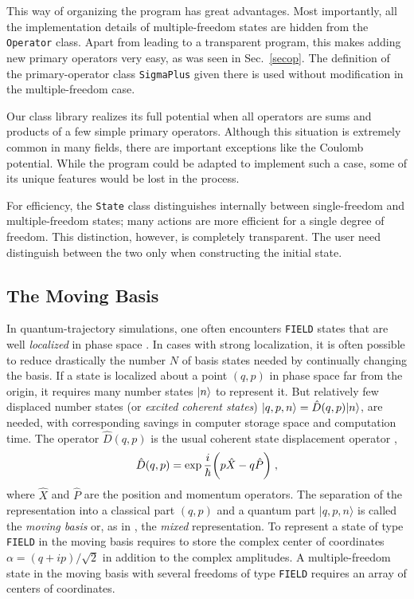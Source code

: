 This way of organizing the program has great advantages. 
Most importantly, all the
implementation details of multiple-freedom states are hidden from the {\tt
Operator} class. Apart from leading to a transparent program, this makes adding
new primary operators very easy, as was seen in Sec.~\ref{secop}. The
definition of the primary-operator class {\tt SigmaPlus} given there is used
without modification in the multiple-freedom case. 

Our class library realizes its full potential when all operators are sums and
products of a few simple primary operators. Although this situation is
extremely common in many fields, there are important exceptions like the
Coulomb potential. While the program could be adapted to implement such a case,
some of its unique features would be lost in the process.

For efficiency, the {\tt State} class distinguishes internally between
single-freedom and multiple-freedom states; many actions are more efficient for
a single degree of freedom.  This distinction, however, is completely
transparent.  The user need distinguish between the two only when constructing
the initial state.


\subsection{The Moving Basis}

In quantum-trajectory simulations, one often encounters {\tt FIELD} states that
are well {\it localized\/} in phase space
{\cite{Gisin1992c,Diosi1988c,%
Gisin1993b,Percival1994b,Steimle1995a,Holland1996a}}. In cases
with strong localization, it is often possible to reduce drastically the number
$N$ of basis states needed by continually changing the basis. If a state is
localized about a point $(q,p)$ in phase space far from the origin, it requires
many number states $| n \rangle$ to represent it.  But relatively few 
displaced number states (or {\it excited
coherent states\/}) $|q,p,n\rangle = \hat D(q,p)| n \rangle$, are needed, with
corresponding savings in computer storage space and computation time.  The
operator $\hat D(q,p)$ is the usual coherent state displacement operator
{\cite{Louisell1973}},
\begin{equation}
\hat D(q,p) = \exp {i\over\hbar} \biggl( p\hat X - q\hat P \biggr) \;,
\end{equation}
where $\hat X$ and $\hat P$ are the position and momentum operators.  The
separation of the representation into a classical part $(q,p)$ and a quantum
part $|q,p,n\rangle$ is called the {\it moving basis\/} {\cite{Schack1995c}}
or, as in \cite{Steimle1995a}, the {\it mixed\/} representation.  To represent
a state of type {\tt FIELD} in the moving basis requires to store the complex
center of coordinates $\alpha=(q+ip)/\sqrt{2}$ in addition to the complex
amplitudes.  A multiple-freedom state in the moving basis with several freedoms
of type {\tt FIELD} requires an array of centers of coordinates.

